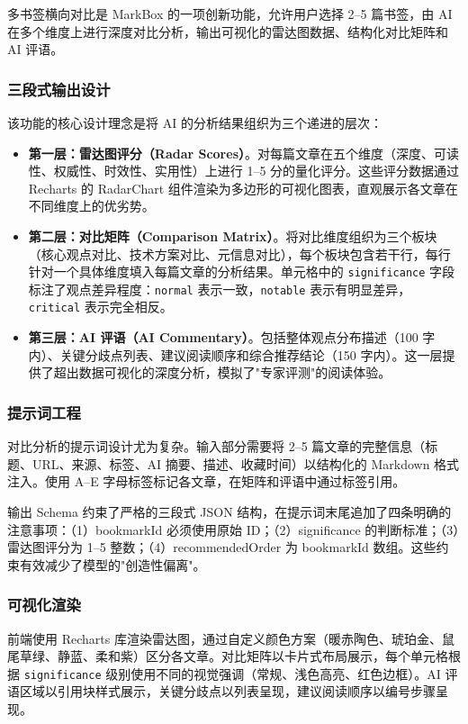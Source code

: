 \documentclass[12pt,a4paper]{ctexart}
\begin{document}
多书签横向对比是 MarkBox 的一项创新功能，允许用户选择 2--5 篇书签，由 AI 在多个维度上进行深度对比分析，输出可视化的雷达图数据、结构化对比矩阵和 AI 评语。

\subsubsection{三段式输出设计}

该功能的核心设计理念是将 AI 的分析结果组织为三个递进的层次：

\begin{itemize}
  \item \textbf{第一层：雷达图评分（Radar Scores）}。对每篇文章在五个维度（深度、可读性、权威性、时效性、实用性）上进行 1--5 分的量化评分。这些评分数据通过 Recharts 的 RadarChart 组件渲染为多边形的可视化图表，直观展示各文章在不同维度上的优劣势。
  \item \textbf{第二层：对比矩阵（Comparison Matrix）}。将对比维度组织为三个板块（核心观点对比、技术方案对比、元信息对比），每个板块包含若干行，每行针对一个具体维度填入每篇文章的分析结果。单元格中的 \texttt{significance} 字段标注了观点差异程度：\texttt{normal} 表示一致，\texttt{notable} 表示有明显差异，\texttt{critical} 表示完全相反。
  \item \textbf{第三层：AI 评语（AI Commentary）}。包括整体观点分布描述（100 字内）、关键分歧点列表、建议阅读顺序和综合推荐结论（150 字内）。这一层提供了超出数据可视化的深度分析，模拟了"专家评测"的阅读体验。
\end{itemize}

\subsubsection{提示词工程}

对比分析的提示词设计尤为复杂。输入部分需要将 2--5 篇文章的完整信息（标题、URL、来源、标签、AI 摘要、描述、收藏时间）以结构化的 Markdown 格式注入。使用 A--E 字母标签标记各文章，在矩阵和评语中通过标签引用。

输出 Schema 约束了严格的三段式 JSON 结构，在提示词末尾追加了四条明确的注意事项：（1）bookmarkId 必须使用原始 ID；（2）significance 的判断标准；（3）雷达图评分为 1--5 整数；（4）recommendedOrder 为 bookmarkId 数组。这些约束有效减少了模型的"创造性偏离"。

\subsubsection{可视化渲染}

前端使用 Recharts 库渲染雷达图，通过自定义颜色方案（暖赤陶色、琥珀金、鼠尾草绿、静蓝、柔和紫）区分各文章。对比矩阵以卡片式布局展示，每个单元格根据 \texttt{significance} 级别使用不同的视觉强调（常规、浅色高亮、红色边框）。AI 评语区域以引用块样式展示，关键分歧点以列表呈现，建议阅读顺序以编号步骤呈现。
\end{document}
